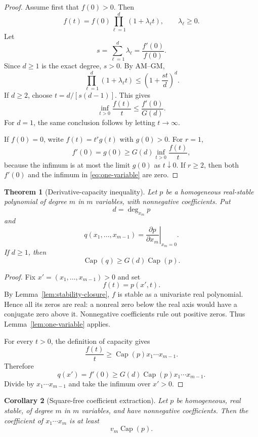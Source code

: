 \documentclass[11pt]{article}
\newtheorem{theorem}{Theorem}[section]
\newtheorem{corollary}[theorem]{Corollary}
\theoremstyle{definition}
\newcommand{\pcap}{\operatorname{Cap}}
\newcommand{\1}{\mathbf{1}}
\begin{document}
\begin{proof}
Assume first that $f(0)>0$.  Then
\[
 f(t)=f(0)\prod_{\ell=1}^d(1+\lambda_\ell t),
 \qquad \lambda_\ell\ge0.
\]
Let
\[
 s=\sum_{\ell=1}^d\lambda_\ell=\frac{f'(0)}{f(0)}.
\]
Since $d\ge1$ is the exact degree, $s>0$.  By AM--GM,
\[
 \prod_{\ell=1}^d(1+\lambda_\ell t)
 \le \left(1+\frac{st}{d}\right)^d.
\]
If $d\ge2$, choose $t=d/[s(d-1)]$.  This gives
\[
 \inf_{t>0}\frac{f(t)}t
 \le \frac{f'(0)}{G(d)}.
\]
For $d=1$, the same conclusion follows by letting $t\to\infty$.

If $f(0)=0$, write $f(t)=t^r g(t)$ with $g(0)>0$.  For $r=1$,
\[
 f'(0)=g(0)\ge G(d)\inf_{t>0}\frac{f(t)}t,
\]
because the infimum is at most the limit $g(0)$ as $t\downarrow0$.  If $r\ge2$, then both $f'(0)$ and the infimum in \eqref{eq:one-variable} are zero.
\end{proof}

\begin{theorem}[Derivative-capacity inequality]\label{thm:derivative-capacity}
Let $p$ be a homogeneous real-stable polynomial of degree $m$ in $m$ variables, with nonnegative coefficients.  Put
\[
 d=\deg_{x_m}p
\]
and
\[
 q(x_1,\dots,x_{m-1})
 =\left.\frac{\partial p}{\partial x_m}\right|_{x_m=0}.
\]
If $d\ge1$, then
\[
 \pcap(q)\ge G(d)\pcap(p).
 \tag{3.3}\label{eq:derivative-capacity}
\]
\end{theorem}

\begin{proof}
Fix $x'=(x_1,\dots,x_{m-1})>0$ and set
\[
 f(t)=p(x',t).
\]
By Lemma~\ref{lem:stability-closure}, $f$ is stable as a univariate real polynomial.  Hence all its zeros are real: a nonreal zero below the real axis would have a conjugate zero above it.  Nonnegative coefficients rule out positive zeros.  Thus Lemma~\ref{lem:one-variable} applies.

For every $t>0$, the definition of capacity gives
\[
 \frac{f(t)}{t}\ge \pcap(p)x_1\cdots x_{m-1}.
\]
Therefore
\[
 q(x')=f'(0)
 \ge G(d)\pcap(p)x_1\cdots x_{m-1}.
\]
Divide by $x_1\cdots x_{m-1}$ and take the infimum over $x'>0$.
\end{proof}

\begin{corollary}[Square-free coefficient extraction]\label{cor:squarefree}
Let $p$ be homogeneous, real stable, of degree $m$ in $m$ variables, and have nonnegative coefficients.  Then the coefficient of $x_1\cdots x_m$ is at least
\[
 v_m\pcap(p).
\]
\end{corollary}
\end{document}
